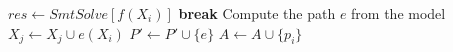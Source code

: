 	\STATE $res \gets SmtSolve\left[
	 f(X_i)
	\right]$
		\STATE \textbf{break}
	\ENDIF
	\STATE Compute the path $e$ from the model
	\STATE $X_j \gets X_j \cup e(X_i)$
	\STATE $P' \gets P' \cup \{e\}$
	\STATE $A \gets A \cup \{p_i\}$
\ENDWHILE
